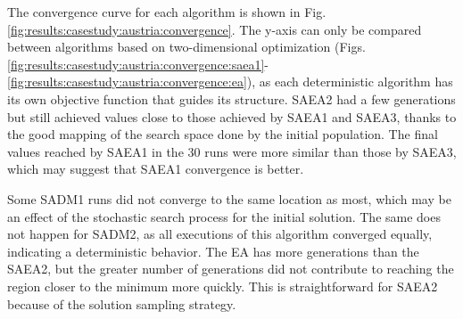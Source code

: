 			
			The convergence curve for each algorithm is shown in Fig. \ref{fig:results:casestudy:austria:convergence}. The y-axis can only be compared between algorithms based on two-dimensional optimization (Figs. \ref{fig:results:casestudy:austria:convergence:saea1}-\ref{fig:results:casestudy:austria:convergence:ea}), as each deterministic algorithm has its own objective function that guides its structure. SAEA2 had a few generations but still achieved values close to those achieved by SAEA1 and SAEA3, thanks to the good mapping of the search space done by the initial population. The final values reached by SAEA1 in the 30 runs were more similar than those by SAEA3, which may suggest that SAEA1 convergence is better.
			
			Some SADM1 runs did not converge to the same location as most, which may be an effect of the stochastic search process for the initial solution. The same does not happen for SADM2, as all executions of this algorithm converged equally, indicating a deterministic behavior. The EA has more generations than the SAEA2, but the greater number of generations did not contribute to reaching the region closer to the minimum more quickly. This is straightforward for SAEA2 because of the solution sampling strategy.			
		
